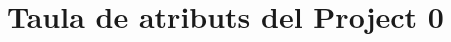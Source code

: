 


\chapter{Taula de atributs del Project 0}

\begin{table}[h!]
	\begin{center}
		\tiny
	\end{center}
\end{table}

